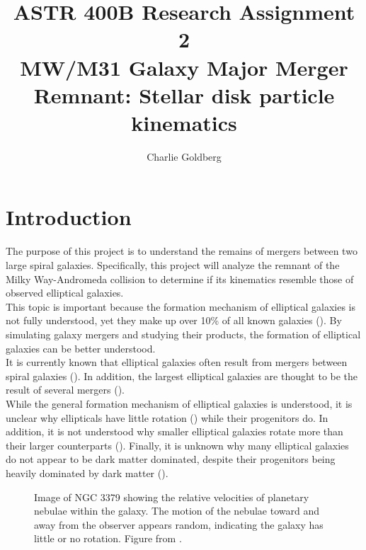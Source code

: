 \documentclass[twocolumn]{aastex63}
\begin{document}
\title{ASTR 400B Research Assignment 2 \\
MW/M31 Galaxy Major Merger Remnant: Stellar disk particle kinematics}

\author[0000-0002-4901-7693]{Charlie Goldberg}


\section{Introduction}

The purpose of this project is to understand the remains of mergers between two large spiral galaxies. Specifically, this project will analyze the remnant of the Milky Way-Andromeda collision to determine if its kinematics resemble those of observed elliptical galaxies.\\

This topic is important because the formation mechanism of elliptical galaxies is not fully understood, yet they make up over 10\% of all known galaxies (\cite{1996MNRAS.278.1025L}). By simulating galaxy mergers and studying their products, the formation of elliptical galaxies can be better understood.\\

It is currently known that elliptical galaxies often result from mergers between spiral galaxies (\cite{2006ApJ...650..791C}). In addition, the largest elliptical galaxies are thought to be the result of several mergers (\cite{2006ApJ...650..791C}).\\

While the general formation mechanism of elliptical galaxies is understood, it is unclear why ellipticals have little rotation (\cite{1998A&AS..133..325G}) while their progenitors do. In addition, it is not understood why smaller elliptical galaxies rotate more than their larger counterparts (\cite{2011MNRAS.414..888E}). Finally, it is unknown why many elliptical galaxies do not appear to be dark matter dominated, despite their progenitors being heavily dominated by dark matter (\cite{2003Sci...301.1696R}).

\begin{figure}
    \centering
    \caption{Image of NGC 3379 showing the relative velocities of planetary nebulae within the galaxy. The motion of the nebulae toward and away from the observer appears random, indicating the galaxy has little or no rotation. Figure from \cite{2003Sci...301.1696R}.}
    \label{dispersion}
\end{figure}
\end{document}
